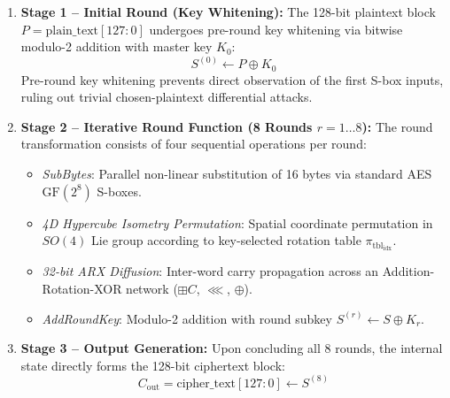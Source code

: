 \documentclass[review,12pt]{elsarticle}
\begin{document}
\begin{enumerate}
    \item \textbf{Stage 1 -- Initial Round (Key Whitening):} The 128-bit plaintext block $P = \text{plain\_text}[127:0]$ undergoes pre-round key whitening via bitwise modulo-2 addition with master key $K_0$:
    \begin{equation}
        S^{(0)} \leftarrow P \oplus K_0
    \end{equation}
    Pre-round key whitening prevents direct observation of the first S-box inputs, ruling out trivial chosen-plaintext differential attacks.
    
    \item \textbf{Stage 2 -- Iterative Round Function (8 Rounds $r = 1 \dots 8$):} The round transformation consists of four sequential operations per round:
    \begin{itemize}
        \item \emph{SubBytes}: Parallel non-linear substitution of 16 bytes via standard AES $\text{GF}(2^8)$ S-boxes.
        \item \emph{4D Hypercube Isometry Permutation}: Spatial coordinate permutation in $SO(4)$ Lie group according to key-selected rotation table $\pi_{\text{tbl}_{\text{idx}}}$.
        \item \emph{32-bit ARX Diffusion}: Inter-word carry propagation across an Addition-Rotation-XOR network ($\boxplus C$, $\lll$, $\oplus$).
        \item \emph{AddRoundKey}: Modulo-2 addition with round subkey $S^{(r)} \leftarrow S \oplus K_r$.
    \end{itemize}
    
    \item \textbf{Stage 3 -- Output Generation:} Upon concluding all 8 rounds, the internal state directly forms the 128-bit ciphertext block:
    \begin{equation}
        C_{\text{out}} = \text{cipher\_text}[127:0] \leftarrow S^{(8)}
    \end{equation}
\end{enumerate}
\end{document}
